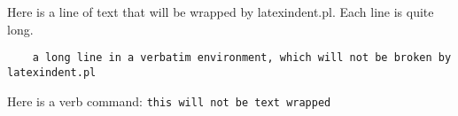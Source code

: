 Here is a line of text that will be wrapped by latexindent.pl. Each line is quite long.

\begin{verbatim}
    a long line in a verbatim environment, which will not be broken by latexindent.pl
\end{verbatim}

Here is a verb command: \verb!this will not be text wrapped!
